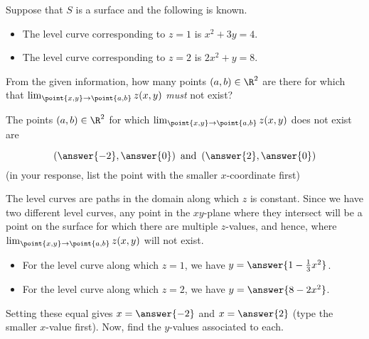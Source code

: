 \documentclass{ximera}
\author{Jim Talamo}
\begin{document}
\begin{exercise}
Suppose that $S$ is a surface and the following is known.

\begin{itemize}
\item The level curve corresponding to $z=1$ is $x^2+3y=4$.
\item The level curve corresponding to $z=2$ is $2x^2+y=8$.
\end{itemize}

From the given information, how many points $(a,b) \in \R^2$ are there for which that $\lim_{\point{x,y} \to \point{a,b}} z(x,y)$ \emph{must} not exist?

\begin{multipleChoice}
\end{multipleChoice}

\begin{exercise}
The points $(a,b) \in \R^2$ for which $\lim_{\point{x,y} \to \point{a,b}} z(x,y)$ does not exist are 

\[
\left(\answer{-2},\answer{0}\right) \textrm{ and } \left(\answer{2},\answer{0}\right)
\]
(in your response, list the point with the smaller $x$-coordinate first)



\begin{hint}
The level curves are paths in the domain along which $z$ is constant.  Since we have two different level curves, any point in the $xy$-plane where they intersect will be a point on the surface for which there are multiple $z$-values, and hence, where $\lim_{\point{x,y} \to \point{a,b}} z(x,y)$ will not exist.

\begin{itemize}
\item For the level curve along which $z=1$, we have $y = \answer{1-\frac{1}{3}x^2}$.
\item For the level curve along which $z=2$, we have $y = \answer{8-2x^2}$.
\end{itemize}

Setting these equal gives $x=\answer{-2}$ and $x=\answer{2}$ (type the smaller $x$-value first).  Now, find the $y$-values associated to each.
\end{hint}

\end{exercise}

\end{exercise}
\end{document}
